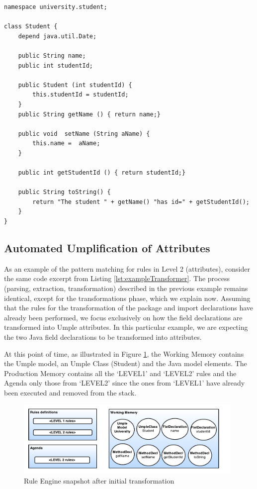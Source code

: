 \begin{lstlisting}[style=umpleOut, label=lst:level1exampleGenerator, caption=Umple code generated -- Level 1]
namespace university.student;

class Student {
	depend java.util.Date;
	
    public String name;
    public int studentId;
    
    public Student (int studentId) {
    	this.studentId = studentId;
    }
    public String getName () { return name;}
    
    public void  setName (String aName) { 
    	this.name =  aName;
    }
   
    public int getStudentId () { return studentId;}

    public String toString() {
    	return "The student " + getName() "has id=" + getStudentId();
    }
}   
\end{lstlisting}

\subsection{Automated Umplification of Attributes}

As an example of the pattern matching for rules in Level 2 (attributes), consider the same code excerpt from Listing \ref{lst:exampleTransformer}. The process (parsing, extraction, transformation) described in the previous example remains identical, except for the transformations phase, which we explain now. Assuming that the rules for the transformation of the package and import declarations have already been performed, we focus exclusively on how the field declarations are transformed into Umple attributes. In this particular example, we are expecting the two Java field declarations to be transformed into attributes. 

At this point of time, as illustrated in Figure \ref{fig:ruleModel2}, the Working Memory contains the Umple model, an Umple Class (Student) and the Java model elements. The Production Memory contains all the `LEVEL1' and `LEVEL2' rules and the Agenda only those from `LEVEL2' since the ones from `LEVEL1' have already been executed and removed from the stack.

\begin{figure}[h]
\centering
\includegraphics[width=0.98\textwidth]{Figures/ruleModel2.pdf}
\caption{Rule Engine snapshot after initial transformation}
\label{fig:ruleModel2}
\end{figure}


